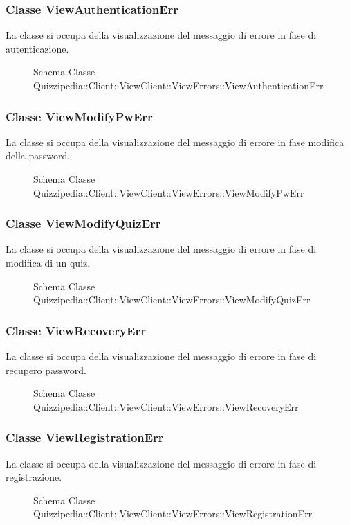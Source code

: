 \subsubsection{Classe ViewAuthenticationErr}
La classe si occupa della visualizzazione del messaggio di errore in fase di autenticazione.
\begin{figure}[H]
\centering
\noindent{}
\caption{Schema Classe Quizzipedia::Client::ViewClient::ViewErrors::ViewAuthenticationErr}
\end{figure}
\subsubsection{Classe ViewModifyPwErr}
La classe si occupa della visualizzazione del messaggio di errore in fase modifica della password.
\begin{figure}[H]
\centering
\noindent{}
\caption{Schema Classe Quizzipedia::Client::ViewClient::ViewErrors::ViewModifyPwErr}
\end{figure}
\subsubsection{Classe ViewModifyQuizErr}
La classe si occupa della visualizzazione del messaggio di errore in fase di modifica di un quiz.
\begin{figure}[H]
\centering
\noindent{}
\caption{Schema Classe Quizzipedia::Client::ViewClient::ViewErrors::ViewModifyQuizErr}
\end{figure}
\subsubsection{Classe ViewRecoveryErr}
La classe si occupa della visualizzazione del messaggio di errore in fase di recupero password.
\begin{figure}[H]
\centering
\noindent{}
\caption{Schema Classe Quizzipedia::Client::ViewClient::ViewErrors::ViewRecoveryErr}
\end{figure}
\subsubsection{Classe ViewRegistrationErr}
La classe si occupa della visualizzazione del messaggio di errore in fase di registrazione.
\begin{figure}[H]
\centering
\noindent{}
\caption{Schema Classe Quizzipedia::Client::ViewClient::ViewErrors::ViewRegistrationErr}
\end{figure}
